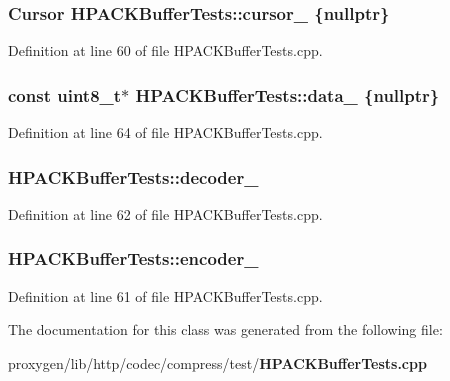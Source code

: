 \subsubsection[{cursor\+\_\+}]{\setlength{\rightskip}{0pt plus 5cm}Cursor H\+P\+A\+C\+K\+Buffer\+Tests\+::cursor\+\_\+ \{{\bf nullptr}\}\hspace{0.3cm}{\ttfamily [protected]}}\label{classHPACKBufferTests_a79d513d42b0e2633ee44d02f314bbbd6}


Definition at line 60 of file H\+P\+A\+C\+K\+Buffer\+Tests.\+cpp.

\subsubsection[{data\+\_\+}]{\setlength{\rightskip}{0pt plus 5cm}const uint8\+\_\+t$\ast$ H\+P\+A\+C\+K\+Buffer\+Tests\+::data\+\_\+ \{{\bf nullptr}\}\hspace{0.3cm}{\ttfamily [protected]}}\label{classHPACKBufferTests_ac894394fcda78b6bd84dd1d08716b6a1}


Definition at line 64 of file H\+P\+A\+C\+K\+Buffer\+Tests.\+cpp.

\subsubsection[{decoder\+\_\+}]{ H\+P\+A\+C\+K\+Buffer\+Tests\+::decoder\+\_\+\hspace{0.3cm}{\ttfamily [protected]}}\label{classHPACKBufferTests_a1a11afebe42825b989e8933bd8cea4b9}


Definition at line 62 of file H\+P\+A\+C\+K\+Buffer\+Tests.\+cpp.

\subsubsection[{encoder\+\_\+}]{ H\+P\+A\+C\+K\+Buffer\+Tests\+::encoder\+\_\+\hspace{0.3cm}{\ttfamily [protected]}}\label{classHPACKBufferTests_a90c7eaaee22b7ebb0f4e44307d66299d}


Definition at line 61 of file H\+P\+A\+C\+K\+Buffer\+Tests.\+cpp.



The documentation for this class was generated from the following file\+:\begin{DoxyCompactItemize}
\item 
proxygen/lib/http/codec/compress/test/{\bf H\+P\+A\+C\+K\+Buffer\+Tests.\+cpp}\end{DoxyCompactItemize}
